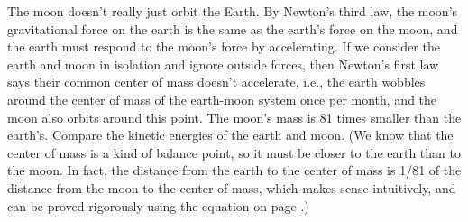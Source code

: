 The moon doesn't really just orbit the Earth. By
Newton's third law, the moon's gravitational force on the
earth is the same as the earth's force on the moon, and the
earth must respond to the moon's force by accelerating. If
we consider the earth and moon in isolation and ignore
outside forces, then Newton's first law says their common
center of mass doesn't accelerate, i.e., the earth wobbles
around the center of mass of the earth-moon system once per
month, and the moon also orbits around this point. The
moon's mass is 81 times smaller than the earth's. Compare
the kinetic energies of the earth and moon.
(We know that the center of mass is a kind of balance point,
so it must be closer to the earth than to the moon. In fact,
the distance from the earth to the center of mass is 1/81
of the distance from the moon to the center of mass,
which makes sense intuitively, and can be proved rigorously
using the equation on page \pageref{cm-equation}.)
